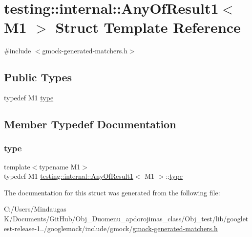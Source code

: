 \hypertarget{structtesting_1_1internal_1_1_any_of_result1}{}\section{testing\+::internal\+::Any\+Of\+Result1$<$ M1 $>$ Struct Template Reference}
\label{structtesting_1_1internal_1_1_any_of_result1}


{\ttfamily \#include $<$gmock-\/generated-\/matchers.\+h$>$}

\subsection*{Public Types}
\begin{DoxyCompactItemize}
\item 
typedef M1 \mbox{\hyperlink{structtesting_1_1internal_1_1_any_of_result1_a4c55b5cf196c93e2a822bc99625f6797}{type}}
\end{DoxyCompactItemize}


\subsection{Member Typedef Documentation}
\mbox{\label{structtesting_1_1internal_1_1_any_of_result1_a4c55b5cf196c93e2a822bc99625f6797}} 
\subsubsection{\texorpdfstring{type}{type}}
{\footnotesize\ttfamily template$<$typename M1$>$ \\
typedef M1 \mbox{\hyperlink{structtesting_1_1internal_1_1_any_of_result1}{testing\+::internal\+::\+Any\+Of\+Result1}}$<$ M1 $>$\+::\mbox{\hyperlink{structtesting_1_1internal_1_1_any_of_result1_a4c55b5cf196c93e2a822bc99625f6797}{type}}}



The documentation for this struct was generated from the following file\+:\begin{DoxyCompactItemize}
\item 
C\+:/\+Users/\+Mindaugas K/\+Documents/\+Git\+Hub/\+Obj\+\_\+\+Duomenu\+\_\+apdorojimas\+\_\+class/\+Obj\+\_\+test/lib/googletest-\/release-\/1../googlemock/include/gmock/\mbox{\hyperlink{_obj__test_2lib_2googletest-release-1_88_81_2googlemock_2include_2gmock_2gmock-generated-matchers_8h}{gmock-\/generated-\/matchers.\+h}}\end{DoxyCompactItemize}
